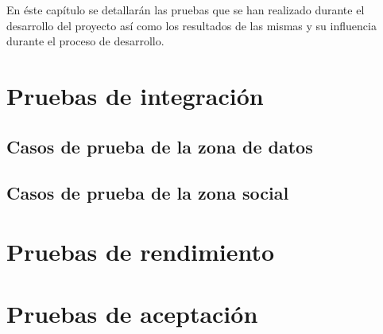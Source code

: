 En éste capítulo se detallarán las pruebas que se han realizado durante el desarrollo del proyecto así como los resultados de las mismas y su influencia durante el proceso de desarrollo.


\section{Pruebas de integración}
\label{pruebas:integracion}
	
	
	\subsection{Casos de prueba de la zona de datos}
	\label{pruebas:integracion:zona_datos}
	
	
	
	\subsection{Casos de prueba de la zona social}
	\label{pruebas:integracion:zona_social}
	


\section{Pruebas de rendimiento}
\label{pruebas:rendimiento}



\section{Pruebas de aceptación}
\label{pruebas:aceptacion}